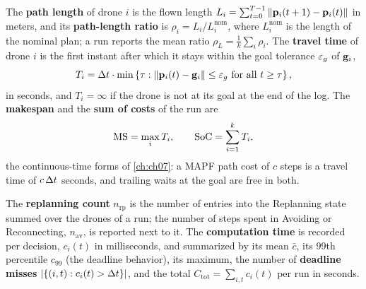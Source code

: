 \begin{definition}
\label{def:ch25-efficiency}
The \textbf{path length} of drone $i$ is the
flown length $L_i = \sum_{t=0}^{T-1} \left\lVert \mathbf{p}_i(t+1) - \mathbf{p}_i(t) \right\rVert$ in
meters, and its \textbf{path-length ratio} is $\rho_i = L_i /
L_i^{\mathrm{nom}}$, where $L_i^{\mathrm{nom}}$ is the length of the nominal
plan; a run reports the mean ratio $\rho_L = \frac{1}{k}\sum_i \rho_i$. The
\textbf{travel time} of drone $i$ is the first instant
after which it stays within the goal tolerance $\varepsilon_g$ of $\mathbf{g}_i$,
\begin{equation}
  T_i = \Delta t \cdot \min\left\{ \tau : \left\lVert \mathbf{p}_i(t) - \mathbf{g}_i \right\rVert \le \varepsilon_g
  \text{ for all } t \ge \tau \right\},
  \label{eq:ch25-travel}
\end{equation}
in seconds, and $T_i = \infty$ if the drone is not at its goal at the end of
the log. The \textbf{makespan} and the
\textbf{sum of costs} of the run are
\begin{equation}
  \mathrm{MS} = \max_{i} T_i, \qquad \mathrm{SoC} = \sum_{i=1}^{k} T_i,
  \label{eq:ch25-objectives}
\end{equation}
the continuous-time forms of \cref{ch:ch07}: a MAPF path cost of $c$ steps
is a travel time of $c\,\Delta t$ seconds, and trailing waits at the goal are free
in both.
\end{definition}

\begin{definition}
\label{def:ch25-effort}
The \textbf{replanning count} $n_{\mathrm{rp}}$ is
the number of entries into the Replanning state summed over the drones of a
run; the number of steps spent in Avoiding or Reconnecting,
$n_{\mathrm{av}}$, is reported next to it. The \textbf{computation
time} is recorded per decision, $c_i(t)$ in
milliseconds, and summarized by its mean $\bar c$, its 99th percentile
$c_{99}$ (the deadline behavior), its maximum, the number of
\textbf{deadline misses} $\left\lvert \left\{ (i,t) : c_i(t) > \Delta t \right\} \right\rvert$, and the total
$C_{\mathrm{tot}} = \sum_{i,t} c_i(t)$ per run in seconds.
\end{definition}


